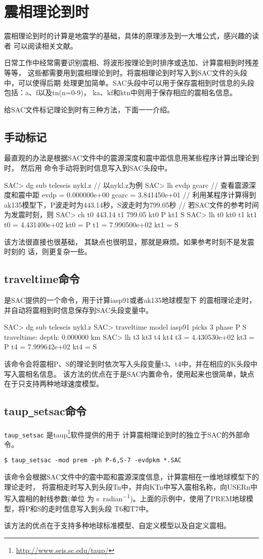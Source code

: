 \section{震相理论到时}
震相理论到时的计算是地震学的基础，具体的原理涉及到一大堆公式，感兴趣的读者
可以阅读相关文献。

日常工作中经常需要识别震相、将波形按理论到时排序或迭加、计算震相到时残差等等，
这些都需要用到震相理论到时。将震相理论到时写入到SAC文件的头段中，可以使得后期
处理更加简单。SAC头段中可以用于保存震相到时信息的头段包括：a、f以及tn(n=0-9)，
ka、kf和ktn中则用于保存相应的震相名信息。

给SAC文件标记理论到时有三种方法，下面一一介绍。

\subsection{手动标记}
最直观的办法是根据SAC文件中的震源深度和震中距信息用某些程序计算出理论到时，
然后用  命令手动将到时信息写入到SAC头段中。
\begin{SACCode}
SAC> dg sub teleseis nykl.z     // 以nykl.z为例
SAC> lh evdp gcarc              // 查看震源深度和震中距
     evdp = 0.000000e+00
    gcarc = 3.841450e+01
// 利用某程序计算得到ak135模型下，P波走时为443.14秒，S波走时为799.05秒
// 若SAC文件的参考时间为发震时刻，则
SAC> ch t0 443.14 t1 799.05 kt0 P kt1 S
SAC> lh t0 kt0 t1 kt1
     t0 = 4.431400e+02
    kt0 = P
     t1 = 7.990500e+02
    kt1 = S
\end{SACCode}
该方法很直接也很基础， 其缺点也很明显，那就是麻烦。如果参考时刻不是发震时刻的
话，则更复杂一些。

\subsection{traveltime命令}
 是SAC提供的一个命令，用于计算iasp91或者ak135地球模型下
的震相理论走时，并自动将震相到时信息保存到SAC头段变量中。
\begin{SACCode}
SAC> dg sub teleseis nykl.z
SAC> traveltime model iasp91 picks 3 phase P S
traveltime: depth: 0.000000 km
SAC> lh t3 kt3 t4 kt4
         t3 = 4.430530e+02
        kt3 = P
         t4 = 7.999642e+02
        kt4 = S
\end{SACCode}
该命令会将震相P、S的理论到时依次写入头段变量t3、t4中，并在相应的K头段中写入震相名信息。
该方法的优点在于是SAC内置命令，使用起来也很简单，缺点在于只支持两种地球速度模型。

\subsection{taup\texttt{\_}setsac命令}
\verb|taup_setsac| 是taup\footnote{\url{http://www.seis.sc.edu/taup/}}软件提供的用于
计算震相理论到时的独立于SAC的外部命令。
\begin{verbatim}
$ taup_setsac -mod prem -ph P-6,S-7 -evdpkm *.SAC
\end{verbatim}
该命令会根据SAC文件中的震中距和震源深度信息，计算震相在一维地球模型下的理论走时，
将震相走时写入到头段Tn中，并向KTn中写入震相名称，向USERn中写入震相的射线参数(单位
为 \si{\s\per radian})。上面的示例中，使用了PREM地球模型，将P和S的走时信息写入到头段
T6和T7中。

该方法的优点在于支持多种地球标准模型、自定义模型以及自定义震相。
